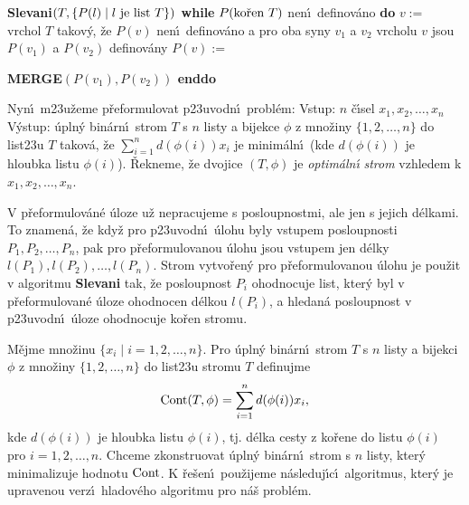 {\bf Slevani$(T,\{P(l)\mid l\text{\rm \ je list }T\})$\newline 
while} $P(\text{\rm ko\v ren }T)$ nen\'\i\ definov\'ano {\bf do\newline 
\phantom{{\rm---}}}$v:=$ vrchol $T$ takov\'y, \v ze $P(v)$ nen\'\i\ 
definov\'ano a\newline 
\phantom{---}pro oba syny $v_1$ a $v_2$ vrcholu $v$ jsou $P(v_1)$ a $
P(v_2)$ definov\'any\newline 
\phantom{---}$P(v):=${\bf MERGE$(P(v_1),P(v_2))$\newline 
enddo
\bigskip

}\flushpar Nyn\'\i\ m\accent23u\v zeme p\v reformulovat p\accent23uvodn\'\i\ 
probl\'em:\newline 
Vstup: $n$ \v c\'\i sel $x_1,x_2,\dots,x_n$\newline 
V\'ystup: \'upln\'y bin\'arn\'\i\ strom $T$ s $n$ listy a bijekce $
\phi$ z 
mno\v ziny $\{1,2,\dots,n\}$ do list\accent23u $T$ takov\'a, \v ze 
$\sum_{i=1}^nd(\phi (i))x_i$ je minim\'aln\'\i\ (kde $d(\phi (i))$ je hloubka 
listu $\phi (i)$).\newline 
\v Rekneme, \v ze dvojice $(T,\phi )$ je \emph{optim\'aln\'\i} 
\emph{strom} vzhledem k $x_1,x_2,\dots,x_n$. 
\medskip

\flushpar V p\v reformulov\'an\'e \'uloze u\v z nepracujeme s 
posloupnostmi, ale jen s jejich d\'elkami. 
To znamen\'a, \v ze kdy\v z pro p\accent23uvodn\'\i\ \'ulohu 
byly vstupem posloupnosti $P_1,P_2,\dots,
P_n$, pak pro 
p\v reformulovanou \'ulohu jsou vstupem jen d\'elky  
$l(P_1),l(P_2),\dots,l(P_n)$. Strom vytvo\v ren\'y pro 
p\v reformulovanou \'ulohu  
je pou\v zit v algoritmu {\bf Slevani}  
tak, \v ze  posloupnost $P_i$ ohodnocuje list, kter\'y byl v 
p\v reformulovan\'e \'uloze ohodnocen d\'elkou $l(P_i)$, a hledan\'a posloupnost 
v p\accent23uvodn\'\i\ \'uloze ohodnocuje ko\v ren stromu. 
\medskip

\flushpar M\v ejme mno\v zinu $\{x_i\mid i=1,2,\dots,n\}$.  Pro \'upln\'y bin\'arn\'\i\ 
strom $T$ s $n$ listy a bijekci $\phi$ z mno\v ziny $\{1,2,\dots,
n\}$ do 
list\accent23u stromu $T$ definujme 
$$\operatorname{Cont}(T,\phi )=\sum_{i=1}^nd(\phi (i))x_i,$$
kde $d(\phi (i))$ je hloubka listu $\phi (i)$, tj.  d\'elka cesty z 
ko\v rene do listu $\phi (i)$  pro $i=1,2,\dots,n$.  
Chceme zkonstruovat \'upln\'y bin\'arn\'\i\ strom s $n$ listy, 
kter\'y minimalizuje hodnotu $\operatorname{Cont}$. K \v re\v sen\'\i\ 
pou\v zijeme n\'asleduj\'\i c\'\i\ algoritmus, kter\'y je upravenou verz\'\i\ 
hladov\'eho algoritmu pro n\'a\v s probl\'em.
\medskip

